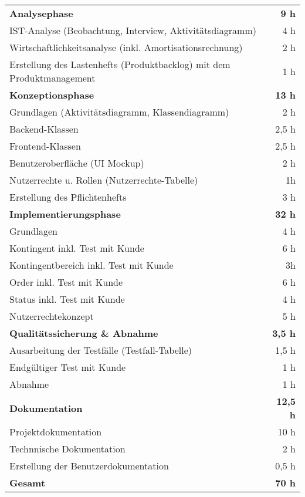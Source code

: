 \begin{tabularx}{\textwidth}{Xr}
    \hline
    \hline
    \rowcolor{heading}\textbf{Analysephase}  & \textbf{9 h}\\
    IST-Analyse (Beobachtung, Interview, Aktivitätsdiagramm)      & 4 h  \\
    \rowcolor{odd}Wirtschaftlichkeitsanalyse (inkl. Amortisationsrechnung) & 2 h\\
    Erstellung des Lastenhefts (Produktbacklog) mit dem Produktmanagement & 1 h\\
    
    \rowcolor{heading}\textbf{Konzeptionsphase} & \textbf{13 h} \\
    Grundlagen (Aktivitätsdiagramm, Klassendiagramm) & 2 h\\
    \rowcolor{odd}Backend-Klassen & 2,5 h\\
    Frontend-Klassen & 2,5 h \\
    \rowcolor{odd}Benutzeroberfläche (UI Mockup) & 2 h \\
    Nutzerrechte u. Rollen (Nutzerrechte-Tabelle) & 1h\\
    \rowcolor{odd} Erstellung des Pflichtenhefts & 3 h\\

    \rowcolor{heading}\textbf{Implementierungsphase} & \textbf{32 h} \\
    Grundlagen & 4 h\\
    \rowcolor{odd}Kontingent inkl. Test mit Kunde & 6 h\\
    Kontingentbereich inkl. Test mit Kunde & 3h\\
    \rowcolor{odd}Order inkl. Test mit Kunde & 6 h \\
    Status inkl. Test mit Kunde & 4 h\\
    \rowcolor{odd} Nutzerrechtekonzept & 5 h\\
    
    \rowcolor{heading}\textbf{Qualitätssicherung \& Abnahme} & \textbf{3,5 h} \\
    Ausarbeitung der Testfälle (Testfall-Tabelle)& 1,5 h\\
    \rowcolor{odd}Endgültiger Test mit Kunde & 1 h\\
    Abnahme & 1 h\\
    
    \rowcolor{heading}\textbf{Dokumentation} & \textbf{12,5 h} \\
     Projektdokumentation & 10 h\\
    \rowcolor{odd}Technnische Dokumentation & 2 h\\
    Erstellung der Benutzerdokumentation & 0,5 h\\
    \hline
    \hline
     \rowcolor{odd}\textbf{Gesamt} & \textbf{70 h} \\
    \hline
\end{tabularx}
